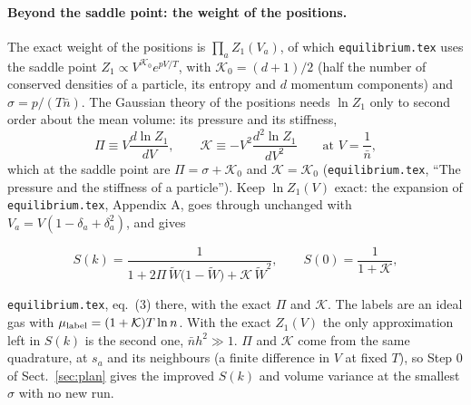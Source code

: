 \documentclass[11pt,aps,preprint,nofootinbib,superscriptaddress,tightenlines]{revtex4-2}
\def\st{\begin{equation}}
\def\stp{\end{equation}}
\def\Sect#1{Sect.~\ref{#1}}
\let\oldparagraph\paragraph
\renewcommand{\paragraph}{\par\bigskip\oldparagraph}
\begin{document}
\paragraph{Beyond the saddle point: the weight of the positions.}  The exact weight of the positions is $\prod_aZ_1(V_a)$, of which \texttt{equilibrium.tex}
uses the saddle point $Z_1\propto V^{\mathcal K_0}e^{pV/T}$, with $\mathcal K_0=(d+1)/2$ (half the number of conserved densities of a particle, its
entropy and $d$ momentum components) and $\sigma=p/(T\bar n)$.  The Gaussian theory of the positions needs $\ln Z_1$ only to second order about the mean
volume: its pressure and its stiffness,
\st
\Pi\equiv V\frac{d\ln Z_1}{dV},\qquad \mathcal K\equiv-V^2\frac{d^2\ln Z_1}{dV^2}\qquad\text{at }V=\frac1{\bar n},
\label{PiK}
\stp
which at the saddle point are $\Pi=\sigma+\mathcal K_0$ and $\mathcal K=\mathcal K_0$ (\texttt{equilibrium.tex}, ``The pressure and the stiffness of a particle'').
Keep $\ln Z_1(V)$ exact: the expansion of \texttt{equilibrium.tex}, Appendix A, goes through unchanged with $V_a=V(1-\delta_a+\delta_a^2)$, and gives
\begin{keyeq}
\st
S(k)=\frac{1}{1+2\Pi\,\widetilde W\big(1-\widetilde W\big)+\mathcal K\,\widetilde W^2},\qquad S(0)=\frac1{1+\mathcal K} ,
\label{Sexact}
\stp
\end{keyeq}
\texttt{equilibrium.tex}, eq.~(3) there, with the exact $\Pi$ and $\mathcal K$.  The labels are an ideal gas with $\mu_{\rm label}=(1+\mathcal K)T\ln n$.  With the exact
$Z_1(V)$ the only approximation left in $S(k)$ is the second one, $\bar nh^2\gg1$.  $\Pi$ and $\mathcal K$ come from the same quadrature, at $s_a$ and its neighbours (a finite difference in $V$ at
fixed $T$), so Step 0 of \Sect{sec:plan} gives the improved $S(k)$ and volume variance at the smallest $\sigma$ with no new run.
\end{document}
